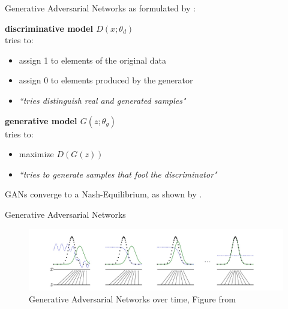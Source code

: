 \documentclass[18pt]{beamer}
\begin{document}
\begin{frame}{Generative Adversarial Networks}
as formulated by \cite{goodfellow14}:\\
\vfill
\begin{minipage}[t]{0.48\linewidth}
    \textbf{discriminative model $D(x; \theta_d)$}\\
    tries to:
    \begin{itemize}
        \item assign 1 to elements of the original data
        \item assign 0 to elements produced by the generator
        \item \textit{``tries distinguish real and generated samples"}
    \end{itemize}
\end{minipage}
\hfill
\begin{minipage}[t]{0.48\linewidth}
    \textbf{generative model $G(z; \theta_g)$}\\
    tries to:
    \begin{itemize}
        \item maximize $D(G(z))$
        \item \textit{``tries to generate samples that fool the discriminator"}
    \end{itemize}
\end{minipage}
\vfill
GANs converge to a Nash-Equilibrium, as shown by \cite{HeuselRUNKH17}.
\end{frame}

\begin{frame}{Generative Adversarial Networks}
    \begin{figure}[h]
    \centering
    \includegraphics[width=1\textwidth]{adversarial_overview}
    \caption{Generative Adversarial Networks over time, Figure from \cite{goodfellow14}}
    \end{figure}
\end{frame}
\end{document}
